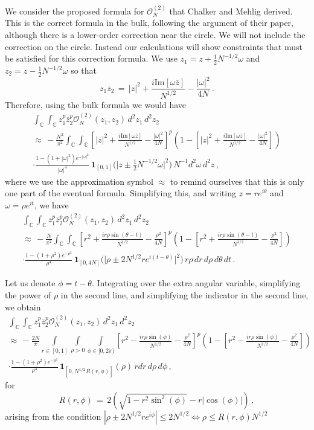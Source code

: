 \documentclass[12pt]{report}
\newcommand{\C}{\mathbb{C}}
\newcommand{\be}{\begin{equation}}
\newcommand{\ee}{\end{equation}}
\theoremstyle{definition}
\begin{document}
We consider the proposed formula for $\mathcal{O}_N^{(2)}$ that Chalker and Mehlig derived.
This is the correct formula in the bulk, following the argument of their paper, although there is a lower-order correction near the circle.
We will not include the correction on the circle. Instead our calculations will show constraints that must be satisfied for this correction formula.
We use $z_1 = z+\frac{1}{2}N^{-1/2}\omega$ and $z_2 = z-\frac{1}{2}N^{-1/2}\omega$ so that
\be
z_1 \overline{z}_2\,
=\, |z|^2 + \frac{i \mathrm{Im}[\omega \overline{z}]}{N^{1/2}} - \frac{|\omega|^2}{4N}\, .
\ee
Therefore, using the bulk formula we would have
\begin{multline}
\int_{\C} \int_{\C} z_1^p \overline{z}_2^p \mathcal{O}_N^{(2)}(z_1,z_2)\, d^2z_1\, d^2z_2\,\\
\approx\, -\frac{N^2}{\pi^2} \int_{\C} \int_{\C} \left[|z|^2 + \frac{i \mathrm{Im}[\omega \overline{z}]}{N^{1/2}} - \frac{|\omega|^2}{4N}\right]^p
\left(1 -  \left[|z|^2 + \frac{i \mathrm{Im}[\omega \overline{z}]}{N^{1/2}} - \frac{|\omega|^2}{4N}\right]\right)\\
\cdot \frac{1-(1+|\omega|^2)e^{-|\omega|^2}}{|\omega|^4}\,
\mathbf{1}_{[0,1]}\Big(\Big|z\pm\frac{1}{2}N^{-1/2}\omega\Big|^2\Big)\, 
N^{-1} d^2\omega\, d^2z\, ,
\end{multline}
where we use the approximation symbol $\approx$ to remind ourselves that this is only one part of the eventual formula.
Simplifying this, and writing $z = r e^{i\theta}$ and $\omega = \rho e^{i t}$, we have
\begin{multline}
\int_{\C} \int_{\C} z_1^p \overline{z}_2^p \mathcal{O}_N^{(2)}(z_1,z_2)\, d^2z_1\, d^2z_2\, \\ \approx\, -\frac{N}{\pi^2} \int_{\C} \int_{\C} \left[r^2 + \frac{i r\rho \sin(\theta-t)}{N^{1/2}} - \frac{\rho^2}{4N}\right]^p
\left(1 -  \left[r^2 + \frac{i r\rho \sin(\theta-t)}{N^{1/2}} - \frac{\rho^2}{4N}\right]\right)\\
\cdot \frac{1-(1+\rho^2)e^{-\rho^2}}{\rho^4}\,
\mathbf{1}_{[0,4N]}\Big(\Big|\rho \pm 2N^{1/2}re^{i(t-\theta)}\Big|^2\Big)\, 
r\rho\, dr\, d\rho\, d\theta\, dt\, .
\end{multline}

Let us denote $\phi = t-\theta$. Integrating over the extra angular variable, simplifying the power of $\rho$ in the second line, and simplifying the indicator in the second line, we obtain\begin{multline}
\int_{\C} \int_{\C} z_1^p \overline{z}_2^p \mathcal{O}_N^{(2)}(z_1,z_2)\, d^2z_1\, d^2z_2\,
 \\ \approx\, -\frac{2N}{\pi} \int\limits_{r \in [0,1]} \int\limits_{\rho>0} \int\limits_{\phi \in [0,2\pi)} \left[r^2 - \frac{i r\rho \sin(\phi)}{N^{1/2}} - \frac{\rho^2}{4N}\right]^p
\left(1 -  \left[r^2 - \frac{i r\rho \sin(\phi)}{N^{1/2}} - \frac{\rho^2}{4N}\right]\right)\\
\cdot \frac{1-(1+\rho^2)e^{-\rho^2}}{\rho^3}\,
\mathbf{1}_{[0,N^{1/2} R(r,\phi)]}(\rho)\, 
r dr\, d\rho\, d\phi\, ,
\end{multline}
 for
\be
R(r,\phi)\, =\, 2 \left(\sqrt{1-r^2\sin^2(\phi)}-r|\cos(\phi)|\right)\, ,
\ee
arising from the condition
$|\rho \pm 2 N^{1/2} r e^{i\phi}| \leq 2N^{1/2} \Leftrightarrow \rho \leq R(r,\phi) N^{1/2}$
\end{document}
